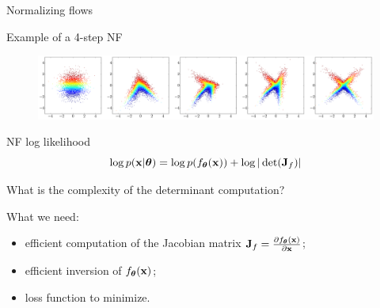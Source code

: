 \begin{frame}{Normalizing flows}
	\begin{block}{Example of a 4-step NF}
		\vspace{-0.2cm}
		\begin{figure}
			\includegraphics[width=\linewidth]{figs/flow_4_steps_example.png}
		\end{figure}
	\end{block}
	\vspace{-0.5cm}
	\begin{block}{NF log likelihood}
		\vspace{-0.3cm}
		\[
		\log p(\mathbf{x}|\boldsymbol{\theta}) = \log p(f_{\boldsymbol{\theta}}(\mathbf{x})) + \log |\det ( \mathbf{J}_f)|
		\]
		\vspace{-0.3cm}
	\end{block}
	What is the complexity of the determinant computation?
	\begin{block}{What we need:}
		\begin{itemize}
			\item efficient computation of the Jacobian matrix $\mathbf{J}_f = \frac{\partial f_{\boldsymbol{\theta}}(\mathbf{x})}{\partial \mathbf{x}}$;
			\item efficient inversion of $f_{\boldsymbol{\theta}}(\mathbf{x})$;
			\item loss function to minimize.
		\end{itemize}
	\end{block}
\end{frame}
